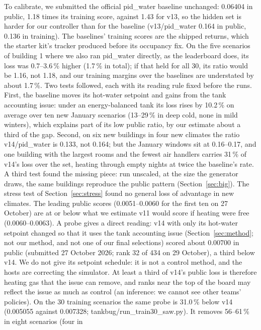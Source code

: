 \documentclass{article}
\begin{document}
To calibrate, we submitted the official pid\_water baseline unchanged: 0.06404 in public, 1.18 times its training
score, against 1.43 for v13, so the hidden set is harder for our controller than for the baseline (v13/pid\_water
0.164 in public, 0.136 in training). The baselines' training scores are the shipped returns, which the starter kit's
tracker produced before its occupancy fix. On the five scenarios of building 1 where we also ran pid\_water directly,
as the leaderboard does, its loss was 0.7--3.6\,\% higher (1.7\,\% in total); if that held for all 30, its ratio
would be 1.16, not 1.18, and our training margins over the baselines are understated by about 1.7\,\%. Two tests followed, each with its reading rule fixed before the runs. First,
the baseline moves its hot-water setpoint and gains from the tank accounting issue: under an energy-balanced tank its
loss rises by 10.2\,\% on average over ten new January scenarios (13--29\,\% in deep cold, none in mild winters),
which explains part of its low public ratio, by our estimate about a third of the gap. Second, on six new buildings
in four new climates the ratio v14/pid\_water is 0.133, not 0.164; but the January windows sit at 0.16--0.17, and
one building with the largest rooms and the fewest air handlers carries 31\,\% of v14's loss over the set, heating
through empty nights at twice the baseline's rate. A third test found the missing piece: run unscaled, at the size
the generator draws, the same buildings reproduce the public pattern (Section~\ref{sec:big}). The stress test of
Section~\ref{sec:stress} found no general loss of advantage in new climates. The leading public scores
(0.0051--0.0060 for the first ten on 27 October) are at or below what we estimate v11 would score if heating were
free (0.0060--0.0063). A probe gives a direct reading: v14 with only its hot-water setpoint changed so that it uses
the tank accounting issue (Section~\ref{sec:method}; not our method, and not one of our final selections) scored about
0.00700 in public (submitted 27 October 2026; rank 32 of 434 on 29 October), a third below v14. We do not give its setpoint schedule: it is not a control method, and the hosts are correcting the simulator. At least a third of v14's public loss is
therefore heating gas that the issue can remove, and ranks near the top of the board may reflect the issue as much as
control (an inference: we cannot see other teams' policies).
On the 30 training scenarios the same probe is 31.0\,\%
below v14 (0.005055 against 0.007328; tankbug/run\_train30\_saw.py). It removes 56--61\,\% in eight scenarios (four in
\end{document}
